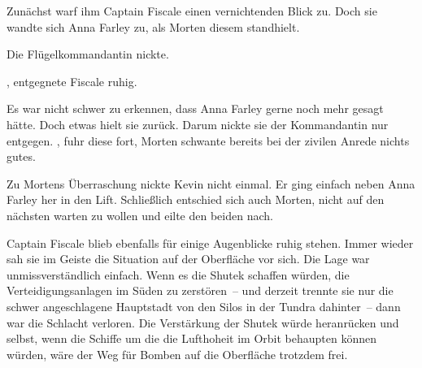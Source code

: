 \par

Zunächst warf ihm Captain Fiscale einen vernichtenden Blick zu. Doch sie wandte sich Anna Farley zu, als Morten diesem standhielt. 

\par

Die Flügelkommandantin nickte. 

\par

, entgegnete Fiscale ruhig. 

\par

Es war nicht schwer zu erkennen, dass Anna Farley gerne noch mehr gesagt hätte. Doch etwas hielt sie zurück. Darum nickte sie der Kommandantin nur entgegen. , fuhr diese fort,  Morten schwante bereits bei der zivilen Anrede nichts gutes. 

\par

Zu Mortens Überraschung nickte Kevin nicht einmal. Er ging einfach neben Anna Farley her in den Lift. Schließlich entschied sich auch Morten, nicht auf den nächsten warten zu wollen und eilte den beiden nach.

\par

Captain Fiscale blieb ebenfalls für einige Augenblicke ruhig stehen. Immer wieder sah sie im Geiste die Situation auf der Oberfläche vor sich. Die Lage war unmissverständlich einfach. Wenn es die Shutek schaffen würden, die Verteidigungsanlagen im Süden zu zerstören~-- und derzeit trennte sie nur die schwer angeschlagene Hauptstadt von den Silos in der Tundra dahinter~-- dann war die Schlacht verloren. Die Verstärkung der Shutek würde heranrücken und selbst, wenn die Schiffe um die  die Lufthoheit im Orbit behaupten können würden, wäre der Weg für Bomben auf die Oberfläche trotzdem frei.

